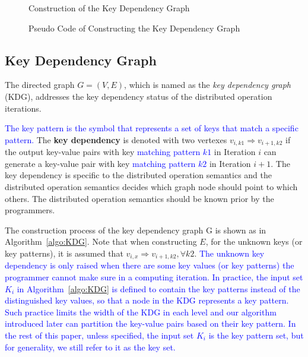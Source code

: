 \documentclass[10pt,journal,compsoc]{IEEEtran}
\makeatletter
\newcommand{\blue}[1]{\textcolor{blue}{#1}}
\newcommand{\removelatexerror}{\let\@latex@error\@gobble}
\makeatother
\begin{document}
\begin{figure}[!t]
\removelatexerror

\begin{algorithm}[H]


\caption{Construction of the Key Dependency Graph}
\label{algo:KDG}
\end{algorithm}

\caption{Pseudo Code of Constructing the Key Dependency Graph}
\label{fig:KDG}
\end{figure}


\subsection{Key Dependency Graph}\label{section:kdg}

The directed graph $G=(V,E)$, which is named as the \emph{key dependency graph} (KDG), addresses the key dependency status of the distributed operation iterations. 

\blue{The key pattern is the symbol that represents a set of keys that match a specific pattern.}
The \textbf{key dependency} is denoted with two vertexes $v_{i,k1} \Rightarrow v_{i+1,k2}$ if
the output key-value pairs with key \blue{matching pattern $k1$}
in Iteration $i$ can generate a key-value pair with key \blue{matching pattern $k2$} in Iteration $i+1$.
The key dependency is specific to the distributed operation semantics
and the distributed operation semantics decides which graph node should point to which others. 
The distributed operation semantics should be known prior by the programmers.

The construction process of the key dependency graph G is shown as in Algorithm~\ref{algo:KDG}.
Note that when constructing $E$, for the unknown keys (or key patterns), it is assumed that $v_{i,x} \Rightarrow v_{i+1,k2}, \forall k2$. 
\blue{
The unknown key dependency is only raised when there are some key values (or key patterns) the programmer cannot make sure in a computing iteration. 
}
\blue{
In practice, the input set $K_i$ in Algorithm~\ref{algo:KDG} is defined to contain the key patterns instead of the distinguished key values, so that a node in the KDG represents a key pattern. 
Such practice limits the width of the KDG in each level
and our algorithm introduced later can partition the key-value pairs based on their key pattern. 
In the rest of this paper, unless specified, the input set $K_i$ is the key pattern set, 
but for generality, we still refer to it as the key set. 
}
\end{document}
